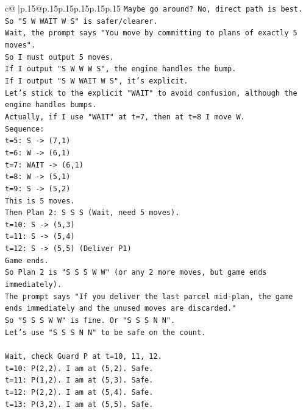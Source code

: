 \documentclass{article}
\begin{document}
{\begin{supertabular}{c@{$\;$}|p{.15\linewidth}@{}p{.15\linewidth}p{.15\linewidth}p{.15\linewidth}p{.15\linewidth}p{.15\linewidth}}
{{{\texttt{Maybe go around? No, direct path is best.} \\
\texttt{So "S W WAIT W S" is safer/clearer.} \\
\texttt{Wait, the prompt says "You move by committing to plans of exactly 5 moves".} \\
\texttt{So I must output 5 moves.} \\
\texttt{If I output "S W W W S", the engine handles the bump.} \\
\texttt{If I output "S W WAIT W S", it's explicit.} \\
\texttt{Let's stick to the explicit "WAIT" to avoid confusion, although the engine handles bumps.} \\
\texttt{Actually, if I use "WAIT" at t=7, then at t=8 I move W.} \\
\texttt{Sequence:} \\
\texttt{t=5: S {-}> (7,1)} \\
\texttt{t=6: W {-}> (6,1)} \\
\texttt{t=7: WAIT {-}> (6,1)} \\
\texttt{t=8: W {-}> (5,1)} \\
\texttt{t=9: S {-}> (5,2)} \\
\texttt{This is 5 moves.} \\
\texttt{Then Plan 2: S S S (Wait, need 5 moves).} \\
\texttt{t=10: S {-}> (5,3)} \\
\texttt{t=11: S {-}> (5,4)} \\
\texttt{t=12: S {-}> (5,5) (Deliver P1)} \\
\texttt{Game ends.} \\
\texttt{So Plan 2 is "S S S W W" (or any 2 more moves, but game ends immediately).} \\
\texttt{The prompt says "If you deliver the last parcel mid{-}plan, the game ends immediately and the unused moves are discarded."} \\
\texttt{So "S S S W W" is fine. Or "S S S N N".} \\
\texttt{Let's use "S S S N N" to be safe on the count.} \\
\\ 
\texttt{Wait, check Guard P at t=10, 11, 12.} \\
\texttt{t=10: P(2,2). I am at (5,2). Safe.} \\
\texttt{t=11: P(1,2). I am at (5,3). Safe.} \\
\texttt{t=12: P(2,2). I am at (5,4). Safe.} \\
\texttt{t=13: P(3,2). I am at (5,5). Safe.} \\
}}}
\end{supertabular}}
\end{document}
